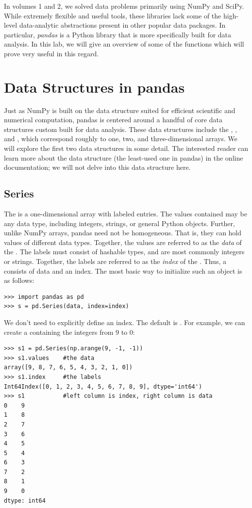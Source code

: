 \label{lab:pandas1}

In volumes 1 and 2, we solved data problems primarily using NumPy and SciPy.
While extremely flexible and useful tools, these libraries lack some of the
high-level data-analytic abstractions present in other popular data packages.
In particular, \emph{pandas} is a Python library that is more specifically
built for data analysis.  In this lab, we will give an overview of some of the
functions which will prove very useful in this regard.

\section*{Data Structures in pandas}
Just as NumPy is built on the  data structure suited for efficient
scientific and numerical computation, pandas is centered around a handful of
core data structures custom built for data analysis. These data structures
include the , , and , which correspond
roughly to one, two, and three-dimensional arrays. We will explore the first
two data structures in some detail. The interested reader can learn more about
the  data structure (the least-used one in pandas) in the online
documentation; we will not delve into this data structure here.

\subsection*{Series}
The  is a one-dimensional array with labeled entries. The values
contained may be any data type, including integers, strings, or general Python
objects. Further, unlike NumPy arrays, pandas  need not be
homogeneous. That is, they can hold values of different data types. Together,
the values are referred to as the \emph{data} of the . The labels
must consist of hashable types, and are most commonly integers or strings.
Together, the labels are referred to as the \emph{index} of the .
Thus, a  consists of data and an index. The most basic way to
initialize such an object is as follows:
\begin{lstlisting}
>>> import pandas as pd
>>> s = pd.Series(data, index=index)
\end{lstlisting}
We don't need to explicitly define an index. The default is
.
For example, we can create a  containing the integers from 9 to 0:
\begin{lstlisting}
>>> s1 = pd.Series(np.arange(9, -1, -1))
>>> s1.values    #the data
array([9, 8, 7, 6, 5, 4, 3, 2, 1, 0])
>>> s1.index     #the labels
Int64Index([0, 1, 2, 3, 4, 5, 6, 7, 8, 9], dtype='int64')
>>> s1           #left column is index, right column is data
0    9
1    8
2    7
3    6
4    5
5    4
6    3
7    2
8    1
9    0
dtype: int64
\end{lstlisting}

